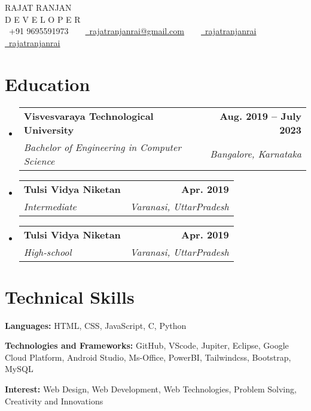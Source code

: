 \documentclass[letterpaper,11pt]{article}
\makeatletter
\newcommand{\resumeSubheading}[4]{
  \vspace{-2pt}\item
    \begin{tabular*}{1.0\textwidth}[t]{l@{\extracolsep{\fill}}r}
      \textbf{#1} & \textbf{\small #2} \\
      \textit{\small#3} & \textit{\small #4} \\
    \end{tabular*}\vspace{-7pt}
}
\newcommand{\resumeSubHeadingListStart}{\begin{itemize}[leftmargin=0.0in, label={}]}
\newcommand{\resumeSubHeadingListEnd}{\end{itemize}}
\makeatother
\begin{document}

\begin{center}
    {\Huge \scshape RAJAT RANJAN} \\ \vspace{1pt}
    D E V E L O P E R \\ \vspace{3pt} 
    \small \raisebox{-0.1\height}\faPhone\ +91 9695591973 ~ ~ \href{mailto:rajatranjanrai@gmail.com}{\raisebox{-0.2\height}\faEnvelope\  \underline{rajatranjanrai@gmail.com}} ~ ~ 
    \href{https://www.linkedin.com/in/rajatranjanrai/}{\raisebox{-0.2\height}\faLinkedin\ \underline{rajatranjanrai}}  ~ ~
    \href{https://github.com/rajatranjanrai}{\raisebox{-0.2\height}\faGithub\ \underline{rajatranjanrai}}
    \vspace{-8pt}
\end{center}


\section{Education}
  \resumeSubHeadingListStart
    \resumeSubheading
      {Visvesvaraya Technological University}{Aug. 2019 -- July 2023}
      {Bachelor of Engineering in Computer Science}{Bangalore, Karnataka}
      \resumeSubheading
      {Tulsi Vidya Niketan}{Apr. 2019}
      {Intermediate}{Varanasi, UttarPradesh}
      \resumeSubheading
      {Tulsi Vidya Niketan}{Apr. 2019}
      {High-school}{Varanasi, UttarPradesh}
  \resumeSubHeadingListEnd

\section{Technical Skills}
\begin{itemize}[leftmargin=0.15in, label={}]
    \small{
        \item \textbf{Languages:} HTML, CSS, JavaScript, C, Python
        \vspace{3pt}
        \item \textbf{Technologies and Frameworks:} GitHub, VScode, Jupiter, Eclipse, Google Cloud Platform, Android Studio, Ms-Office, PowerBI, Tailwindcss, Bootstrap, MySQL
        \vspace{3pt}
        \item \textbf{Interest:} Web Design, Web Development, Web Technologies, Problem Solving, Creativity and Innovations
    }
\end{itemize}
\vspace{-10pt}
\end{document}
